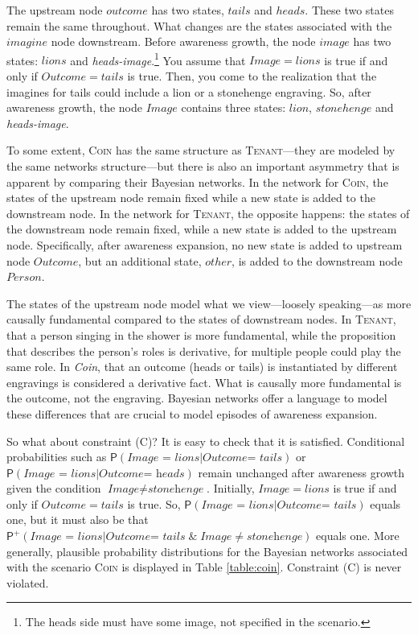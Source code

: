 \documentclass[
  11pt,
  dvipsnames,enabledeprecatedfontcommands]{scrartcl}
\newcommand{\pr}[1]{\ensuremath{\mathsf{P}(#1)}}
\newcommand{\ppr}[2]{\ensuremath{\mathsf{P}^{#1}(#2)}}
\begin{document}
\noindent The upstream node \(outcome\) has two states, \(tails\) and
\(heads\). These two states remain the same throughout. What changes are
the states associated with the \(imagine\) node downstream. Before
awareness growth, the node \(image\) has two states: \(lions\) and
\textit{heads-image}.\footnote{The heads side must have some image, not
  specified in the scenario.} You assume that \(Image=lions\) is true if
and only if \(Outcome=tails\) is true. Then, you come to the realization
that the imagines for tails could include a lion or a stonehenge
engraving. So, after awareness growth, the node \(Image\) contains three
states: \(lion\), \(stonehenge\) and \textit{heads-image}.

To some extent, \textsc{Coin} has the same structure as
\textsc{Tenant}---they are modeled by the same networks structure---but
there is also an important asymmetry that is apparent by comparing their
Bayesian networks. In the network for \textsc{Coin}, the states of the
upstream node remain fixed while a new state is added to the downstream
node. In the network for \textsc{Tenant}, the opposite happens: the
states of the downstream node remain fixed, while a new state is added
to the upstream node. Specifically, after awareness expansion, no new
state is added to upstream node \(Outcome\), but an additional state,
\(other\), is added to the downstream node \(Person\).

The states of the upstream node model what we view---loosely
speaking---as more causally fundamental compared to the states of
downstream nodes. In \textsc{Tenant}, that a person singing in the
shower is more fundamental, while the proposition that describes the
person's roles is derivative, for multiple people could play the same
role. In \textit{Coin}, that an outcome (heads or tails) is instantiated
by different engravings is considered a derivative fact. What is
causally more fundamental is the outcome, not the engraving. Bayesian
networks offer a language to model these differences that are crucial to
model episodes of awareness expansion.

So what about constraint (C)? It is easy to check that it is satisfied.
Conditional probabilities such as
\(\pr{\textit{Image = lions} \vert \textit{Outcome= tails}}\) or
\(\pr{\textit{Image = lions} \vert \textit{Outcome= heads}}\) remain
unchanged after awareness growth given the condition
\(\textit{Image} \neq \textit{stonehenge}\). Initially, \(Image=lions\)
is true if and only if \(Outcome=tails\) is true. So,
\(\pr{\textit{Image = lions} \vert \textit{Outcome= tails}}\) equals
one, but it must also be that
\(\ppr{+}{\textit{Image = lions} \vert \textit{Outcome= tails} \; \& \; \textit{Image} \neq \textit{stonehenge}}\)
equals one. More generally, plausible probability distributions for the
Bayesian networks associated with the scenario \textsc{Coin} is
displayed in Table \ref{table:coin}. Constraint (C) is never violated.
\end{document}
